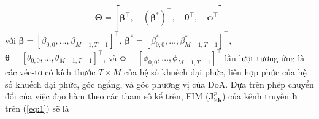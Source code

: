 \begin{equation}
    \boldsymbol{\Theta}=\left[ \boldsymbol{\beta}^\top, \quad \boldsymbol{(\beta^*)}^\top, \quad \boldsymbol{\theta}^\top, \quad \boldsymbol{\phi}^\top \right]
\end{equation}
với $\boldsymbol{\beta}=\left[\beta_{0,0}, \ldots, \beta_{M-1, T -1}\right]^{\top}$, $\boldsymbol{\beta^*}=\left[\beta^*_{0,0}, \ldots, \beta^*_{M-1, T - 1}\right]^{\top}$, $\boldsymbol{\theta}=\left[\theta_{0,0}, \ldots, \theta_{M-1, T - 1}\right]^{\top}$, và $\boldsymbol{\phi}=\left[\phi_{0,0}, \ldots, \phi_{M-1, T - 1}\right]^{\top}$ lần lượt tương ứng là các véc-tơ có kích thước $T \times M$ của hệ số khuếch đại phức, liên hợp phức của hệ số khuếch đại phức, góc ngẩng, và góc phương vị của DoA. Dựa trên phép chuyển đổi của việc đạo hàm theo các tham số kể trên, FIM ($\mathbf{J}^p_{\mathbf{h} \mathbf{h}}$) của kênh truyền $\mathbf{h}$ trên (\ref{eq:1}) sẽ là

